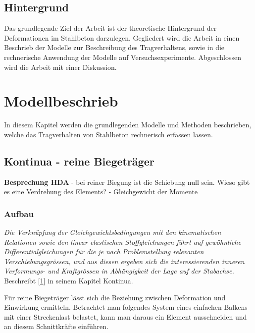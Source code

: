 \documentclass[
  12pt,
  letterpaper,
  egregdoesnotlikesansseriftitles]{scrreprt}
\begin{document}
\hypertarget{hintergrund}{%
\section{Hintergrund}\label{hintergrund}}

Das grundlegende Ziel der Arbeit ist der theoretische Hintergrund der
Deformationen im Stahlbeton darzulegen. Gegliedert wird die Arbeit in
einen Beschrieb der Modelle zur Beschreibung des Tragverhaltens, sowie
in die rechnerische Anwendung der Modelle auf Versuchsexperimente.
Abgeschlossen wird die Arbeit mit einer Diskussion.


\hypertarget{modellbeschrieb}{%
\chapter{Modellbeschrieb}\label{modellbeschrieb}}

In diesem Kapitel werden die grundlegenden Modelle und Methoden
beschrieben, welche das Tragverhalten von Stahlbeton rechnerisch
erfassen lassen.

\hypertarget{sec-kontinua}{%
\section{Kontinua - reine Biegeträger}\label{sec-kontinua}}

\textbf{Besprechung HDA} - bei reiner Biegung ist die Schiebung null
sein. Wieso gibt es eine Verdrehung des Elements? - Gleichgewicht der
Momente

\hypertarget{aufbau}{%
\subsection{Aufbau}\label{aufbau}}

\emph{Die Verknüpfung der Gleichgewichtsbedingungen mit den
kinematischen Relationen sowie den linear elastischen Stoffgleichungen
führt auf gewöhnliche Differentialgleichungen für die je nach
Problemstellung relevanten Verschiebungsgrössen, und aus diesen ergeben
sich die interessierenden inneren Verformungs- und Kraftgrössen in
Abhängigkeit der Lage auf der Stabachse.} Beschreibt
{[}\protect\hyperlink{ref-Marti}{1}{]} in seinem Kapitel Kontinua.

Für reine Biegeträger lässt sich die Beziehung zwischen Deformation und
Einwirkung ermitteln. Betrachtet man folgendes System eines einfachen
Balkens mit einer Streckenlast belastet, kann man daraus ein Element
ausschneiden und an diesem Schnittkräfte einführen.
\end{document}
